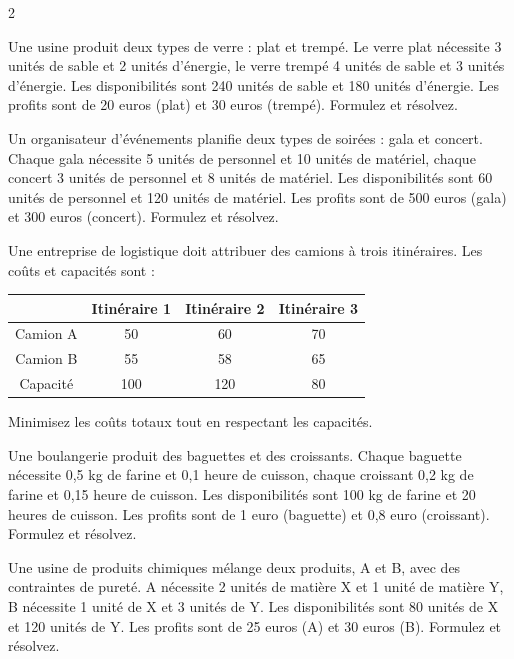 \begin{multicols}{2}
\begin{exo}
	Une usine produit deux types de verre : plat et trempé. Le verre plat nécessite 3 unités de sable et 2 unités d'énergie, le verre trempé 4 unités de sable et 3 unités d'énergie. Les disponibilités sont 240 unités de sable et 180 unités d'énergie. Les profits sont de 20 euros (plat) et 30 euros (trempé). Formulez et résolvez.
\end{exo}

\begin{exo}
	Un organisateur d'événements planifie deux types de soirées : gala et concert. Chaque gala nécessite 5 unités de personnel et 10 unités de matériel, chaque concert 3 unités de personnel et 8 unités de matériel. Les disponibilités sont 60 unités de personnel et 120 unités de matériel. Les profits sont de 500 euros (gala) et 300 euros (concert). Formulez et résolvez.
\end{exo}

\begin{exo}
	Une entreprise de logistique doit attribuer des camions à trois itinéraires. Les coûts et capacités sont :
	\begin{center}
		\begin{tabular}{c|ccc}
			& Itinéraire 1 & Itinéraire 2 & Itinéraire 3 \\
			\hline
			Camion A & 50 & 60 & 70 \\
			Camion B & 55 & 58 & 65 \\
			Capacité & 100 & 120 & 80 \\
		\end{tabular}
	\end{center}
	Minimisez les coûts totaux tout en respectant les capacités.
\end{exo}

\begin{exo}
	Une boulangerie produit des baguettes et des croissants. Chaque baguette nécessite 0,5 kg de farine et 0,1 heure de cuisson, chaque croissant 0,2 kg de farine et 0,15 heure de cuisson. Les disponibilités sont 100 kg de farine et 20 heures de cuisson. Les profits sont de 1 euro (baguette) et 0,8 euro (croissant). Formulez et résolvez.
\end{exo}

\begin{exo}
	Une usine de produits chimiques mélange deux produits, A et B, avec des contraintes de pureté. A nécessite 2 unités de matière X et 1 unité de matière Y, B nécessite 1 unité de X et 3 unités de Y. Les disponibilités sont 80 unités de X et 120 unités de Y. Les profits sont de 25 euros (A) et 30 euros (B). Formulez et résolvez.
\end{exo}


\end{multicols}
